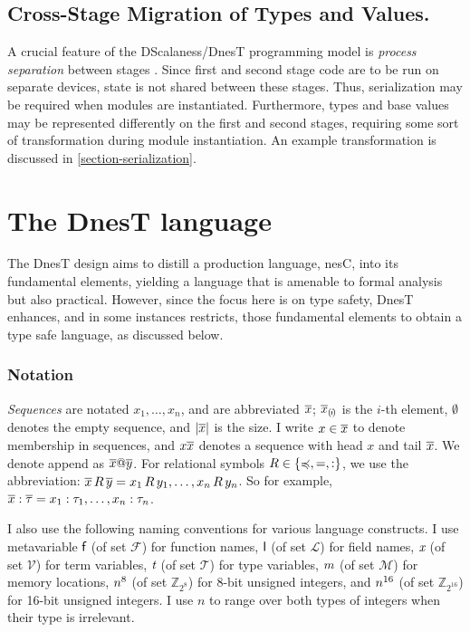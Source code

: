 \subsection{Cross-Stage Migration of Types and Values.} 

A crucial feature of the DScalaness/DnesT programming model is \emph{process separation} between
stages \cite{FramedML}. Since first and second stage code are to be run on separate devices,
state is not shared between these stages. Thus, serialization may be required when modules are
instantiated. Furthermore, types and base values may be represented differently on the first and
second stages, requiring some sort of transformation during module instantiation. An example
transformation is discussed in \autoref{section-serialization}.

\section{The DnesT language}
\label{section-nest-theory}
 
The DnesT design aims to distill a production language, nesC, into its fundamental elements,
yielding a language that is amenable to formal analysis but also practical. However, since the
focus here is on type safety, DnesT enhances, and in some instances restricts, those fundamental
elements to obtain a type safe language, as discussed below.

\subsubsection{Notation}

\emph{Sequences} are notated $x_1,\ldots,x_n$, and are abbreviated $\overline{x}$;
$\overline{x}_{(\mskip -2.5mu i\mskip -2.5mu)}$ is the $i$-th element, $\emptyset$ denotes the empty sequence, and
$|\overline{x}|$ is the size. I write $x \in \overline{x}$ to denote membership in sequences, and
$x\overline{x}$ denotes a sequence with head $x$ and tail $\overline{x}$. We denote append as
$\overline{x}@\overline{y}$. For relational symbols $R \in \{ \preccurlyeq, =, : \}$, we use the
abbreviation: $\overline{x}\, R\, \overline{y} = x_1\, R\, y_1, \ldots, x_n\, R\, y_n$. So for example,
$\overline{x} : \overline{\tau} = x_1 : \tau_1,\ldots,x_n : \tau_n$.

I also use the following naming conventions for various language constructs. I use metavariable
$\textsf{f}$ (of set $\mathcal{F}$) for function names, $\textsf{l}$ (of set $\mathcal{L}$) for field
names, $\textit{x}$ (of set $\mathcal{V}$) for term variables, $\textit{t}$ (of set $\mathcal{T}$) for type
variables, $m$ (of set $\mathcal{M}$) for memory locations, $n^{8}$ (of set
$\mathbb{Z}_{2^8}$) for 8-bit unsigned integers, and $n^{16}$ (of set $\mathbb{Z}_{2^{16}}$)
for 16-bit unsigned integers. I use $n$ to range over both types of integers when their type is
irrelevant.

